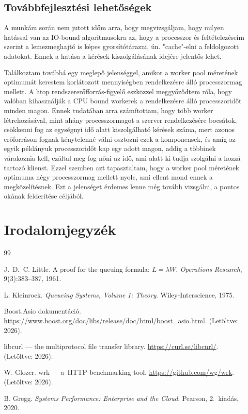 \documentclass[11pt,a4paper]{article}
\begin{document}
\subsection{Továbbfejlesztési lehetőségek}
\label{ssec:tovabbfejlesztes}
A munkám során nem jutott időm arra, hogy megvizsgáljam, hogy milyen hatással van az IO-bound algoritmusokra az, hogy
a processzor és feltételezéseim szerint a lemezmeghajtó is képes gyorsítótárazni, ún. "cache"-elni a feldolgozott adatokat.
Ennek a hatása a kérések kiszolgálásának idejére jelentős lehet.

Találkoztam továbbá egy meglepő jelenséggel, amikor a worker pool méretének optimumát kerestem korlátozott mennyiségben rendelkezésre álló processzormag mellett.
A htop rendszererőfforrás-figyelő eszközzel meggyőződtem róla, hogy valóban kihasználják a CPU bound workerek a rendelkezésre álló processzoridőt minden magon.
Ennek tudatában arra számítottam, hogy több worker létrehozásával, mint ahány processzormagot a szerver rendelkezésére bocsátok, csökkenni fog az egységnyi idő alatt
kiszolgálható kérések száma, mert azonos erőforráson fognak kénytelenné válni osztozni ezek a komponensek, és amíg az egyik példányuk processzoridőt kap egy adott magon,
addig a többinek várakoznia kell, ezáltal meg fog nőni az idő, ami alatt ki tudja szolgálni a hozzá tartozó klienst.
Ezzel szemben azt tapasztaltam, hogy a worker pool méretének optimuma négy processzormag mellett nyolc, ami ellent mond ennek a megközelítésnek.
Ezt a jelenséget érdemes lenne még tovább vizsgálni, a pontos okának felderítése céljából.



\section*{Irodalomjegyzék}
\label{sec:irodalom}

\begin{thebibliography}{99}

J.~D.~C. Little.
\newblock A proof for the queuing formula: $L = \lambda W$.
\newblock \emph{Operations Research}, 9(3):383--387, 1961.

L. Kleinrock.
\newblock \emph{Queueing Systems, Volume 1: Theory}.
\newblock Wiley-Interscience, 1975.

Boost.Asio dokumentáció.
\newblock \url{https://www.boost.org/doc/libs/release/doc/html/boost_asio.html}.
\newblock (Letöltve: 2026).

libcurl --- the multiprotocol file transfer library.
\newblock \url{https://curl.se/libcurl/}.
\newblock (Letöltve: 2026).

W. Glozer.
\newblock wrk --- a~HTTP benchmarking tool.
\newblock \url{https://github.com/wg/wrk}.
\newblock (Letöltve: 2026).

B. Gregg.
\newblock \emph{Systems Performance: Enterprise and the Cloud}.
\newblock Pearson, 2.~kiadás, 2020.


\end{thebibliography}
\end{document}
